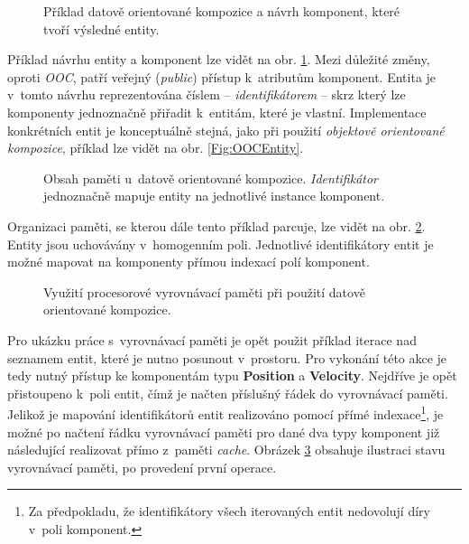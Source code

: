 \begin{figure}[H]
	\centering
	\caption{Příklad datově orientované kompozice a návrh komponent, které tvoří výsledné entity.}
	\label{Fig:DOCHierarchy}
\end{figure}

Příklad návrhu entity a komponent lze vidět na obr. \ref{Fig:DOCHierarchy}. Mezi důležité změny, oproti \emph{OOC}, patří veřejný (\emph{public}) přístup k~atributům komponent. Entita je v~tomto návrhu reprezentována číslem -- \emph{identifikátorem} -- skrz který lze komponenty jednoznačně přiřadit k~entitám, které je vlastní. Implementace konkrétních entit je konceptuálně stejná, jako při použití \emph{objektově orientované kompozice}, příklad lze vidět na obr. \ref{Fig:OOCEntity}.

\begin{figure}[H]
	\centering
	\caption{Obsah paměti u~datově orientované kompozice. \emph{Identifikátor} jednoznačně mapuje entity na jednotlivé instance komponent.}
	\label{Fig:DOCMemory}
\end{figure}

Organizaci paměti, se kterou dále tento příklad parcuje, lze vidět na obr. \ref{Fig:DOCMemory}. Entity jsou uchovávány v~homogenním poli. Jednotlivé identifikátory entit je možné mapovat na komponenty přímou indexací polí komponent.

\begin{figure}[H]
	\centering
	\caption{Využití procesorové vyrovnávací paměti při použití datově orientované kompozice.}
	\label{Fig:DOCCache}
\end{figure}

Pro ukázku práce s~vyrovnávací paměti je opět použit příklad iterace nad seznamem entit, které je nutno posunout v~prostoru. Pro vykonání této akce je tedy nutný přístup ke komponentám typu \textbf{Position} a \textbf{Velocity}. Nejdříve je opět přistoupeno k~poli entit, čímž je načten příslušný řádek do vyrovnávací paměti. Jelikož je mapování identifikátorů entit realizováno pomocí přímé indexace\footnote{Za předpokladu, že identifikátory všech iterovaných entit nedovolují díry v~poli komponent.}, je možné po načtení řádku vyrovnávací paměti pro dané dva typy komponent již následující realizovat přímo z~paměti \emph{cache}. Obrázek \ref{Fig:DOCCache} obsahuje ilustraci stavu vyrovnávací paměti, po provedení první operace.

